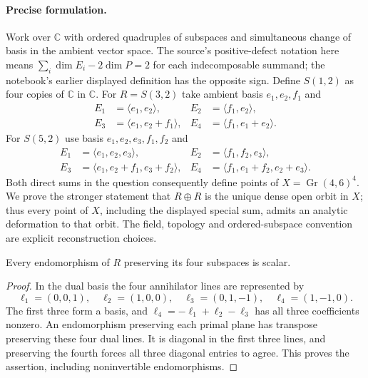 \paragraph{Precise formulation.}
Work over $\mathbb C$ with ordered quadruples of subspaces and
simultaneous change of basis in the ambient vector space. The
source's positive-defect notation here means
$\sum_i\dim E_i-2\dim P=2$ for each indecomposable summand;
the notebook's earlier displayed definition has the opposite sign.
Define $S(1,2)$ as four copies of $\mathbb C$ in $\mathbb C$.
For $R=S(3,2)$ take ambient basis $e_1,e_2,f_1$ and
\[
 \begin{aligned}
 E_1&=\langle e_1,e_2\rangle,&
 E_2&=\langle f_1,e_2\rangle,\\
 E_3&=\langle e_1,e_2+f_1\rangle,&
 E_4&=\langle f_1,e_1+e_2\rangle.
 \end{aligned}
\]
For $S(5,2)$ use basis $e_1,e_2,e_3,f_1,f_2$ and
\[
 \begin{aligned}
 E_1&=\langle e_1,e_2,e_3\rangle,&
 E_2&=\langle f_1,f_2,e_3\rangle,\\
 E_3&=\langle e_1,e_2+f_1,e_3+f_2\rangle,&
 E_4&=\langle f_1,e_1+f_2,e_2+e_3\rangle.
 \end{aligned}
\]
Both direct sums in the question consequently define points of
$X=\operatorname{Gr}(4,6)^4$. We prove the stronger statement
that $R\oplus R$ is the unique dense open orbit in $X$; thus every
point of $X$, including the displayed special sum, admits an
analytic deformation to that orbit. The field, topology and
ordered-subspace convention are explicit reconstruction choices.

\begin{lemma}\ours{}
Every endomorphism of $R$ preserving its four subspaces is scalar.
\end{lemma}

\begin{proof}
In the dual basis the four annihilator lines are represented by
\[
 \ell_1=(0,0,1),\quad\ell_2=(1,0,0),\quad
 \ell_3=(0,1,-1),\quad\ell_4=(1,-1,0).
\]
The first three form a basis, and
$\ell_4=-\ell_1+\ell_2-\ell_3$ has all three coefficients nonzero.
An endomorphism preserving each primal plane has transpose
preserving these four dual lines. It is diagonal in the first
three lines, and preserving the fourth forces all three diagonal
entries to agree. This proves the assertion, including
noninvertible endomorphisms.
\end{proof}

